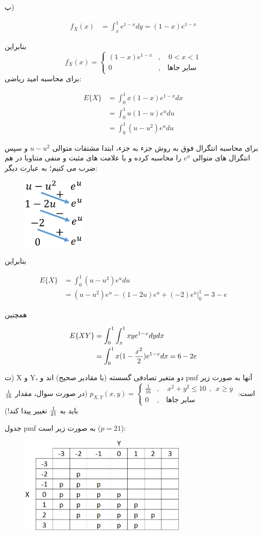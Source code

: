 \documentclass[10pt,letterpaper]{report}
\newcommand{\eqn}[1]{
\[\begin{split}
#1
\end{split}\]
}
\begin{document}
پ)
\eqn{
f_X(x)&=\int_x^1e^{1-x}dy=(1-x)e^{1-x}
}
بنابراین
$$
f_{X}(x)=\begin{cases}
(1-x)e^{1-x}&,\quad 0<x<1\\
0&,\quad \text{سایر جاها}
\end{cases}
$$
برای محاسبه امید ریاضی:
\eqn{
E\{X\}&=\int_0^1 x(1-x)e^{1-x}dx
\\&=\int_0^1 u(1-u)e^{u}du
\\&=\int_0^1 (u-u^2)e^{u}du
}
برای محاسبه انتگرال فوق به روش جزء به جزء، ابتدا مشتقات متوالی $u-u^2$ و سپس انتگرال های متوالی $e^u$ را محاسبه کرده و با علامت های مثبت و منفی متناوبا در هم ضرب می کنیم؛ به عبارت دیگر:
\begin{figure}[htbp]
\centering
\includegraphics[width=30mm]{ibp_hw11.png}
\end{figure}
بنابراین
\eqn{
E\{X\}&=\int_0^1 (u-u^2)e^{u}du
\\&=(u-u^2)e^{u}-(1-2u)e^{u}+(-2)e^u\Big|_0^1=3-e
}
همچنین
\eqn{
E\{XY\}&=\int_0^1\int_x^1 xye^{1-x}dydx
\\&=\int_0^1 x(1-{x^2\over 2})e^{1-x}dx=6-2e
}

ت) X و Y، دو متغیر تصادفی گسسته (با مقادیر صحیح) اند و pmf آنها به صورت زیر است:
$
p_{X,Y}(x,y)=\begin{cases}
\frac{1}{16}&,\quad x^2+y^2\le 10 \ \ ,\ \ x\ge y\\
0&,\quad \text{سایر جاها}
\end{cases}
$
(در صورت سوال، مقدار $1\over 16$ باید به $1\over 21$ تغییر پیدا کند!)

جدول pmf به صورت زیر است ($p=21$):
\begin{figure}[htbp]
\centering
\includegraphics[width=80mm]{hw11_pmf.png}
\end{figure}
\end{document}
